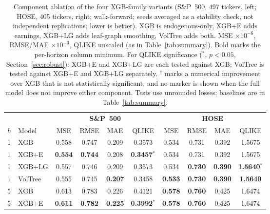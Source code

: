 \documentclass[runningheads,a4paper]{llncs}
\begin{document}
\begin{table}[t]
\centering
\caption{Component ablation of the four XGB-family variants (S\&P~500, 497 tickers, left; HOSE, 405
tickers, right; walk-forward; seeds averaged as a stability check, not independent replications; lower is
better). XGB is endogenous-only, XGB+E adds earnings, XGB+LG adds leaf-graph smoothing, VolTree adds both.
MSE $\times10^{-6}$, RMSE/MAE $\times10^{-3}$, QLIKE unscaled (as in Table~\ref{tab:summary}). Bold marks
the per-horizon column minimum. For QLIKE significance ($^{*}$, $p<0.05$, Section~\ref{sec:robust}): XGB+E
and XGB+LG are each tested against XGB; VolTree is tested against XGB+E and XGB+LG separately. $^{\dagger}$
marks a numerical improvement over XGB that is not statistically significant, and no marker is shown
when the full model does not improve either component. Tests use unrounded losses; baselines are in
Table~\ref{tab:summary}.}
\label{tab:detail}
\scriptsize
\setlength{\tabcolsep}{3pt}
\begin{tabular}{ll cccc cccc}
\toprule
& & \multicolumn{4}{c}{\textbf{S\&P~500}} & \multicolumn{4}{c}{\textbf{HOSE}} \\
\cmidrule(lr){3-6}\cmidrule(lr){7-10}
$h$ & Model & MSE & RMSE & MAE & QLIKE & MSE & RMSE & MAE & QLIKE \\
\midrule
1 & XGB      & 0.558 & 0.747 & 0.209 & 0.3573 & 0.534 & 0.731 & 0.392 & 1.5675 \\
1 & XGB+E    & \textbf{0.554} & \textbf{0.744} & 0.208 & \textbf{0.3457$^{*}$} & 0.534 & 0.731 & 0.392 & 1.5675 \\
1 & XGB+LG   & 0.557 & 0.746 & 0.209 & 0.3573 & 0.534 & \textbf{0.730} & \textbf{0.390} & \textbf{1.5640$^{*}$} \\
1 & VolTree  & 0.555 & 0.745 & \textbf{0.207} & 0.3458 & \textbf{0.533} & \textbf{0.730} & \textbf{0.390} & \textbf{1.5640} \\
\midrule
5 & XGB      & 0.613 & 0.783 & 0.226 & 0.4121 & \textbf{0.578} & \textbf{0.760} & 0.425 & 1.6474 \\
5 & XGB+E    & \textbf{0.611} & \textbf{0.782} & \textbf{0.225} & \textbf{0.3992$^{*}$} & \textbf{0.578} & \textbf{0.760} & 0.425 & 1.6474 \\

\end{tabular}
\end{table}
\end{document}
